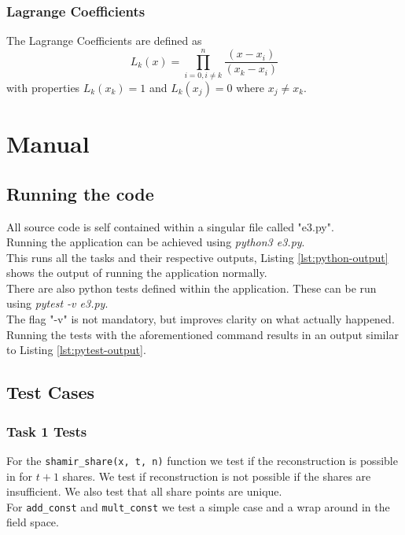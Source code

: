 \documentclass{article}
\begin{document}
            \subsubsection{Lagrange Coefficients}\label{lagrange}
                The Lagrange Coefficients are defined as 
                \begin{equation*}
                    L_k(x) = \prod_{i=0,i\not=k}^n \frac{(x-x_i)}{(x_k-x_i)}
                \end{equation*}
                with properties $L_k(x_k) = 1$ and $L_k(x_j) = 0$ where $x_j \not= x_k$.

    \newpage
	\section{Manual}
		\subsection{Running the code}
		All source code is self contained within a singular file called "e3.py".\\
		Running the application can be achieved using \textit{python3 e3.py}.\\
		This runs all the tasks and their respective outputs, Listing \ref{lst:python-output} shows the output of running the application normally.\\
		There are also python tests defined within the application. These can be run using \textit{pytest -v e3.py}.\\
		The flag "-v" is not mandatory, but improves clarity on what actually happened.\\
		Running the tests with the aforementioned command results in an output similar to Listing \ref{lst:pytest-output}.
		
		\subsection{Test Cases}
	
		\subsubsection{Task 1 Tests}
		For the \lstinline{shamir_share(x, t, n)} function we test if the reconstruction is possible in for $t+1$ shares.
		We test if reconstruction is not possible if the shares are insufficient.
		We also test that all share points are unique.\\
		For \lstinline{add_const} and \lstinline{mult_const} we test a simple case and a wrap around in the field space.\\
		
\end{document}
